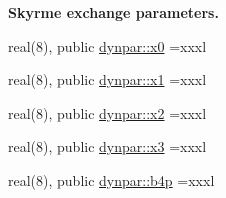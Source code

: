\begin{Indent}{\bf Skyrme exchange parameters.}\par
\begin{DoxyCompactItemize}
\item 
real(8), public \hyperlink{namespacedynpar_a7461eb81aceaa783be48352dd5139d52}{dynpar\+::x0} =xxxl
\item 
real(8), public \hyperlink{namespacedynpar_a1795899561c89510221eb9813958b454}{dynpar\+::x1} =xxxl
\item 
real(8), public \hyperlink{namespacedynpar_ab79dff0c71924920f22bdb65728854d1}{dynpar\+::x2} =xxxl
\item 
real(8), public \hyperlink{namespacedynpar_a342536ef5b89d8d63d638f7e1545c34d}{dynpar\+::x3} =xxxl
\item 
real(8), public \hyperlink{namespacedynpar_a22a91c088555645f2484f961d89687a0}{dynpar\+::b4p} =xxxl
\end{DoxyCompactItemize}
\end{Indent}

